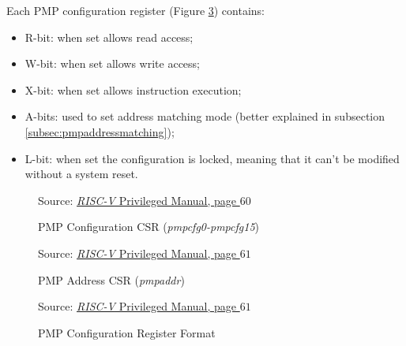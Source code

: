 Each PMP configuration register (Figure \ref{fig:pmpconf}) contains:
\begin{itemize}
  \item R-bit: when set allows read access;

  \item W-bit: when set allows write access;

  \item X-bit: when set allows instruction execution;

  \item A-bits: used to set address matching mode (better explained in subsection
    \ref{subsec:pmpaddressmatching});

  \item L-bit: when set the configuration is locked, meaning that it can't be modified
    without a system reset.
\end{itemize}

\begin{figure}[htbp]
  \centering
  \def\stackalignment{r}
  {\scriptsize Source: \href{https://drive.google.com/file/d/17GeetSnT5wW3xNuAHI95-SI1gPGd5sJ_/view}{\textit{RISC-V} Privileged Manual, page $60$}}
  \caption{PMP Configuration CSR (\textit{pmpcfg0-pmpcfg15})}
  \label{fig:pmpcfgs}
\end{figure}

\begin{figure}[htbp]
  \centering
  \def\stackalignment{r} %
  {\scriptsize Source: \href{https://drive.google.com/file/d/17GeetSnT5wW3xNuAHI95-SI1gPGd5sJ_/view}{\textit{RISC-V} Privileged Manual, page $61$}}
  \caption{PMP Address CSR (\textit{pmpaddr})}
  \label{fig:pmpaddr}
\end{figure}

\begin{figure}[htbp]
  \centering
  \def\stackalignment{r} %
  {\scriptsize Source: \href{https://drive.google.com/file/d/17GeetSnT5wW3xNuAHI95-SI1gPGd5sJ_/view}{\textit{RISC-V} Privileged Manual, page $61$}}
  \caption{PMP Configuration Register Format}
  \label{fig:pmpconf}
\end{figure}

